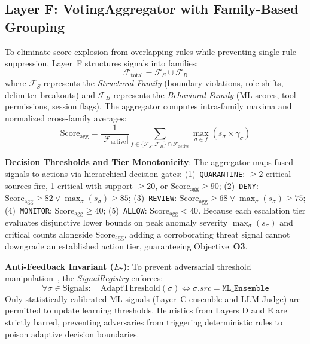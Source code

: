 \documentclass[runningheads]{llncs}
\begin{document}
\subsection{Layer F: VotingAggregator with Family-Based Grouping}
\label{sec:voting_aggregator}
To eliminate score explosion from overlapping rules while preventing single-rule suppression, Layer~F structures signals into families:
\begin{equation}
\mathcal{F}_{\text{total}} = \mathcal{F}_S \cup \mathcal{F}_B
\end{equation}
where $\mathcal{F}_S$ represents the \textit{Structural Family} (boundary violations, role shifts, delimiter breakouts) and $\mathcal{F}_B$ represents the \textit{Behavioral Family} (ML scores, tool permissions, session flags). The aggregator computes intra-family maxima and normalized cross-family averages:
\begin{equation}
\text{Score}_{\text{agg}} = \frac{1}{|\mathcal{F}_{\text{active}}|} \sum_{f \in \{\mathcal{F}_S, \mathcal{F}_B\} \cap \mathcal{F}_{\text{active}}} \max_{\sigma \in f} (s_\sigma \times \gamma_\sigma)
\end{equation}

\noindent\textbf{Decision Thresholds and Tier Monotonicity}: The aggregator maps fused signals to actions via hierarchical decision gates: (1)~\texttt{QUARANTINE}: $\ge 2$ critical sources fire, 1 critical with support $\ge 20$, or $\text{Score}_{\text{agg}} \ge 90$; (2)~\texttt{DENY}: $\text{Score}_{\text{agg}} \ge 82 \lor \max_{\sigma}(s_\sigma) \ge 85$; (3)~\texttt{REVIEW}: $\text{Score}_{\text{agg}} \ge 68 \lor \max_{\sigma}(s_\sigma) \ge 75$; (4)~\texttt{MONITOR}: $\text{Score}_{\text{agg}} \ge 40$; (5)~\texttt{ALLOW}: $\text{Score}_{\text{agg}} < 40$. Because each escalation tier evaluates disjunctive lower bounds on peak anomaly severity $\max_{\sigma}(s_\sigma)$ and critical counts alongside $\text{Score}_{\text{agg}}$, adding a corroborating threat signal cannot downgrade an established action tier, guaranteeing Objective~\textbf{O3}.

\noindent\textbf{Anti-Feedback Invariant ($E_7$)}: To prevent adversarial threshold manipulation~\cite{axelsson2000base}, the \textit{SignalRegistry} enforces:
\begin{equation}
\forall \sigma \in \text{Signals}: \quad \text{AdaptThreshold}(\sigma) \iff \sigma.src = \texttt{ML\_Ensemble}
\end{equation}
Only statistically-calibrated ML signals (Layer~C ensemble and LLM Judge) are permitted to update learning thresholds. Heuristics from Layers D and E are strictly barred, preventing adversaries from triggering deterministic rules to poison adaptive decision boundaries.
\end{document}
